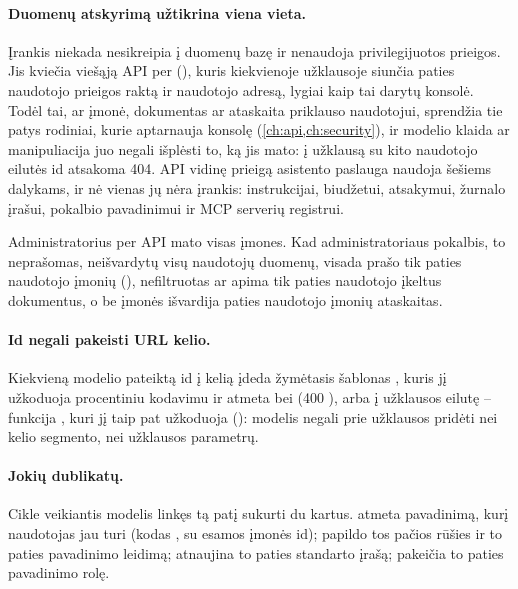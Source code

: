 \paragraph{Duomenų atskyrimą užtikrina viena vieta.} Įrankis niekada nesikreipia į duomenų bazę
ir nenaudoja privilegijuotos prieigos. Jis kviečia viešąją API per 
(), kuris kiekvienoje užklausoje siunčia paties naudotojo prieigos raktą
ir naudotojo adresą, lygiai kaip tai darytų konsolė. Todėl tai, ar įmonė, dokumentas ar ataskaita
priklauso naudotojui, sprendžia tie patys rodiniai, kurie aptarnauja konsolę
(\cref{ch:api,ch:security}), ir modelio klaida ar manipuliacija juo negali išplėsti to, ką jis
mato: į užklausą su kito naudotojo eilutės id atsakoma 404. API vidinę prieigą asistento paslauga naudoja
šešiems dalykams, ir nė vienas jų nėra įrankis: instrukcijai, biudžetui, atsakymui, žurnalo
įrašui, pokalbio pavadinimui ir MCP serverių registrui.

Administratorius per API mato visas įmones. Kad administratoriaus pokalbis, to neprašomas,
neišvardytų visų naudotojų duomenų,  visada prašo tik paties naudotojo įmonių
(), nefiltruotas  ar  apima tik
paties naudotojo įkeltus dokumentus, o  be įmonės išvardija paties naudotojo
įmonių ataskaitas.

\paragraph{Id negali pakeisti URL kelio.} Kiekvieną modelio pateiktą id į kelią įdeda žymėtasis
šablonas , kuris jį užkoduoja procentiniu kodavimu ir atmeta  bei 
(400 ), arba į užklausos eilutę -- funkcija , kuri jį taip pat
užkoduoja (): modelis negali prie užklausos pridėti nei kelio segmento,
nei užklausos parametrų.

\paragraph{Jokių dublikatų.} Cikle veikiantis modelis linkęs tą patį sukurti du kartus.
 atmeta pavadinimą, kurį naudotojas jau turi (kodas ,
su esamos įmonės id);  papildo tos pačios rūšies ir to paties pavadinimo
leidimą;  atnaujina to paties standarto įrašą; 
pakeičia to paties pavadinimo rolę.

